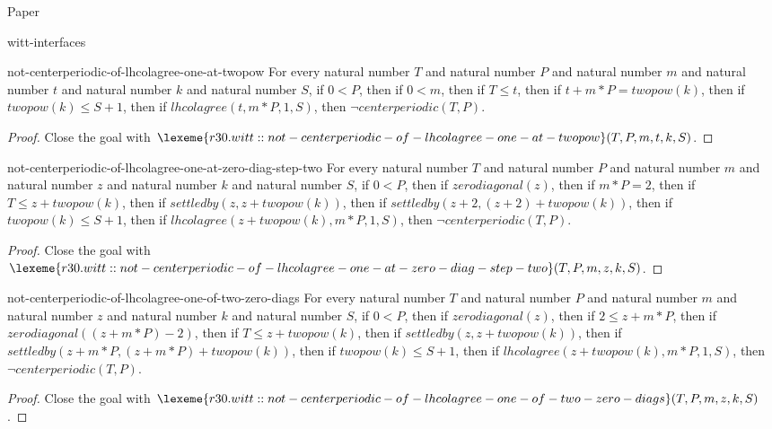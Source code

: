 \begin{lexlean}{Paper}
\begin{section}{witt-interfaces}
  \begin{theorem}{not-centerperiodic-of-lhcolagree-one-at-twopow}
  For every natural number \(T\) and natural number \(P\) and natural number \(m\) and natural number \(t\) and natural number \(k\) and natural number \(S\), if \(0 < P\), then if \(0 < m\), then if \(T ≤ t\), then if \(t + m * P = twopow(k)\), then if \(twopow(k) ≤ S + 1\), then if \(lhcolagree(t, m * P, 1, S)\), then \(¬ centerperiodic(T, P)\).
  \begin{proof}
  Close the goal with \(\lexeme{r30.witt::not-centerperiodic-of-lhcolagree-one-at-twopow}(T, P, m, t, k, S)\).
  \end{proof}
  \end{theorem}

  \begin{theorem}{not-centerperiodic-of-lhcolagree-one-at-zero-diag-step-two}
  For every natural number \(T\) and natural number \(P\) and natural number \(m\) and natural number \(z\) and natural number \(k\) and natural number \(S\), if \(0 < P\), then if \(zerodiagonal(z)\), then if \(m * P = 2\), then if \(T ≤ z + twopow(k)\), then if \(settledby(z, z + twopow(k))\), then if \(settledby(z + 2, (z + 2) + twopow(k))\), then if \(twopow(k) ≤ S + 1\), then if \(lhcolagree(z + twopow(k), m * P, 1, S)\), then \(¬ centerperiodic(T, P)\).
  \begin{proof}
  Close the goal with \(\lexeme{r30.witt::not-centerperiodic-of-lhcolagree-one-at-zero-diag-step-two}(T, P, m, z, k, S)\).
  \end{proof}
  \end{theorem}

  \begin{theorem}{not-centerperiodic-of-lhcolagree-one-of-two-zero-diags}
  For every natural number \(T\) and natural number \(P\) and natural number \(m\) and natural number \(z\) and natural number \(k\) and natural number \(S\), if \(0 < P\), then if \(zerodiagonal(z)\), then if \(2 ≤ z + m * P\), then if \(zerodiagonal((z + m * P) - 2)\), then if \(T ≤ z + twopow(k)\), then if \(settledby(z, z + twopow(k))\), then if \(settledby(z + m * P, (z + m * P) + twopow(k))\), then if \(twopow(k) ≤ S + 1\), then if \(lhcolagree(z + twopow(k), m * P, 1, S)\), then \(¬ centerperiodic(T, P)\).
  \begin{proof}
  Close the goal with \(\lexeme{r30.witt::not-centerperiodic-of-lhcolagree-one-of-two-zero-diags}(T, P, m, z, k, S)\).
  \end{proof}
  \end{theorem}


\end{section}
\end{lexlean}
